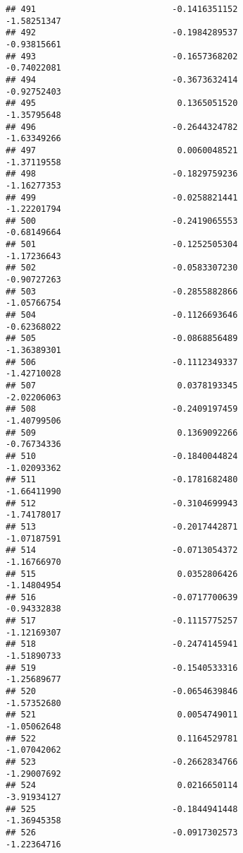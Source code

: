 \documentclass[
]{article}
\begin{document}
\begin{verbatim}
## 491                           -0.1416351152                -1.58251347
## 492                           -0.1984289537                -0.93815661
## 493                           -0.1657368202                -0.74022081
## 494                           -0.3673632414                -0.92752403
## 495                            0.1365051520                -1.35795648
## 496                           -0.2644324782                -1.63349266
## 497                            0.0060048521                -1.37119558
## 498                           -0.1829759236                -1.16277353
## 499                           -0.0258821441                -1.22201794
## 500                           -0.2419065553                -0.68149664
## 501                           -0.1252505304                -1.17236643
## 502                           -0.0583307230                -0.90727263
## 503                           -0.2855882866                -1.05766754
## 504                           -0.1126693646                -0.62368022
## 505                           -0.0868856489                -1.36389301
## 506                           -0.1112349337                -1.42710028
## 507                            0.0378193345                -2.02206063
## 508                           -0.2409197459                -1.40799506
## 509                            0.1369092266                -0.76734336
## 510                           -0.1840044824                -1.02093362
## 511                           -0.1781682480                -1.66411990
## 512                           -0.3104699943                -1.74178017
## 513                           -0.2017442871                -1.07187591
## 514                           -0.0713054372                -1.16766970
## 515                            0.0352806426                -1.14804954
## 516                           -0.0717700639                -0.94332838
## 517                           -0.1115775257                -1.12169307
## 518                           -0.2474145941                -1.51890733
## 519                           -0.1540533316                -1.25689677
## 520                           -0.0654639846                -1.57352680
## 521                            0.0054749011                -1.05062648
## 522                            0.1164529781                -1.07042062
## 523                           -0.2662834766                -1.29007692
## 524                            0.0216650114                -3.91934127
## 525                           -0.1844941448                -1.36945358
## 526                           -0.0917302573                -1.22364716

\end{verbatim}
\end{document}
